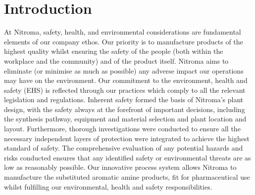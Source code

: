 \section{Introduction}

At Nitroma, safety, health, and environmental considerations are fundamental elements of our company ethos. Our priority is to manufacture products of the highest quality whilst ensuring the safety of the people (both within the workplace and the community) and of the product itself. Nitroma aims to eliminate (or minimise as much as possible) any adverse impact our operations may have on the environment. Our commitment to the environment, health and safety (EHS) is reflected through our practices which comply to all the relevant legislation and regulations. Inherent safety formed the basis of Nitroma’s plant design, with the safety always at the forefront of important decisions, including the synthesis pathway, equipment and material selection and plant location and layout. Furthermore, thorough investigations were conducted to ensure all the necessary independent layers of protection were integrated to achieve the highest standard of safety. The comprehensive evaluation of any potential hazards and risks conducted ensures that any identified safety or environmental threats are as low as reasonably possible. Our innovative process system allows Nitroma to manufacture the substituted aromatic amine products, fit for pharmaceutical use whilst fulfilling our environmental, health and safety responsibilities.

